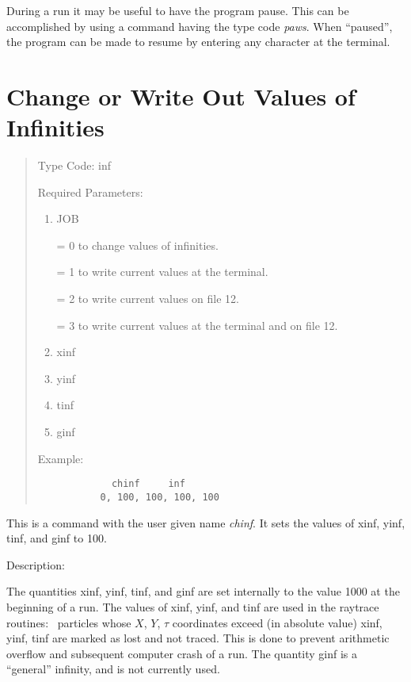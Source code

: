 During a \Mary run it may be useful to have the program pause.  This can
be accomplished by using a command having the type code {\em paws}.  When ``paused'', the
program can be made to resume by entering any character at the terminal.

\newpage
\section{Change or Write Out Values of Infinities}
\begin{quotation}
\noindent     Type Code:  inf
\vspace{5mm}

\noindent     Required Parameters:
\begin{enumerate}
       \item  JOB

              = 0 to change values of infinities.

              = 1 to write current values at the terminal.

              = 2 to write current values on file 12.

              = 3 to write current values at the terminal and on file 12.

       \item  xinf
       \item  yinf
       \item  tinf
       \item  ginf
\end{enumerate}

\vspace{5mm}
\noindent     Example:
\begin{verbatim}
             chinf     inf
           0, 100, 100, 100, 100
\end{verbatim}
\end{quotation}

This is a command with the user given name {\em chinf}.  It sets the values of xinf, yinf, tinf, and ginf to 100.

\vspace{5mm}
     Description:
\vspace{2mm}

The quantities xinf, yinf, tinf, and ginf are set internally to the value 1000 at the beginning of a \Mary run.  The values of xinf, yinf, and tinf are used in the raytrace routines: \ particles whose $X$, $Y$, $\tau$ coordinates  exceed (in absolute value) xinf, yinf, tinf are marked as lost and not traced.  This is done to prevent arithmetic overflow and subsequent computer crash of a \Mary run.  The quantity ginf is a ``general'' infinity, and is not currently used.

